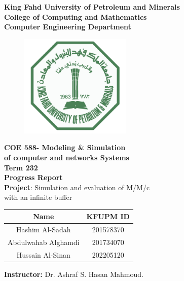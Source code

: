 \graphicspath{{./images}}

\begin{center}
    \onehalfspacing
    {\Large \textbf{King Fahd University of Petroleum and Minerals} }\\ 
    {\large \textbf{
    College of Computing and Mathematics\\
    Computer Engineering Department 
    } } 
\end{center} 

\begin{figure}[h]
    \centering
    \includegraphics[width=200px]{images/KFUPM_LOGO.png}
\end{figure}

\begin{center}\onehalfspacing
    \large \textbf{COE 588- Modeling \& Simulation \\of computer and networks Systems }\\
    \normalsize \textbf{Term 232} \\
    \large \textbf{Progress Report}\\
    \textbf{Project}: Simulation and evaluation of M/M/c \\ with an infinite buffer 
\end{center}
\vspace{1em}
\large
\begin{center}
\bgroup
\def\arraystretch{1.3}
\begin{tabular}{|c|c|}
    \hline
    \textbf{Name} & \textbf{KFUPM ID} \\
    \hline
    Hashim Al-Sadah & 201578370\\
    \hline
    Abdulwahab Alghamdi & 201734070\\
    \hline
    Hussain Al-Sinan & 202205120\\
    \hline 
\end{tabular}
\egroup
\end{center}
\vspace{1em}
\begin{center}
    \textbf{Instructor:} Dr. Ashraf S. Hasan Mahmoud.
\end{center}
\normalsize

